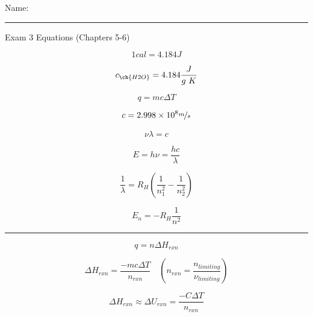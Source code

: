 \documentclass[11pt, letterpaper]{memoir}
\begin{document}
{\large Name: \rule[-1mm]{4in}{.1pt}

\begin{center}
	{\large Exam 3 Equations (Chapters 5-6)}
\end{center}

\begin{minipage}[c][\stretch{1}][c]{0.46\linewidth}
	\begin{equation*}
		1cal=4.184J
	\end{equation*}

	\begin{equation*}
		c_{\ch{H2O}}=4.184\frac{J}{g~K}
	\end{equation*}

	\begin{equation*}
		q=mc\Delta T
	\end{equation*}

	\begin{equation*}
		c=2.998\times10^8\nicefrac{m}{s}
	\end{equation*}

	\begin{equation*}
		\nu\lambda=c
	\end{equation*}

	\begin{equation*}
		E=h\nu=\frac{hc}{\lambda}
	\end{equation*}

	\begin{equation*}
		\frac{1}{\lambda} = R_H\left(\frac{1}{n_1^2}-\frac{1}{n_2^2}\right)
	\end{equation*}

	\begin{equation*}
		E_n = -R_H\frac{1}{n^2}
	\end{equation*}
\end{minipage}
\rule[-300pt]{1.5pt}{600pt}
\begin{minipage}[c][\stretch{1}][c]{0.5\linewidth}
	\begin{equation*}
		q=n\Delta H_{rxn}
	\end{equation*}

	\begin{equation*}
		\Delta H_{rxn}	= \frac{-mc\Delta T}{n_{rxn}} \hspace{1em} \left(n_{rxn}=\frac{n_{limiting}}{\nu_{limiting}}\right)
	\end{equation*}

	\begin{equation*}
		\Delta H_{rxn} \approx \Delta U_{rxn}	= \frac{-C\Delta T}{n_{rxn}}
	\end{equation*}


\end{minipage}}
\end{document}
